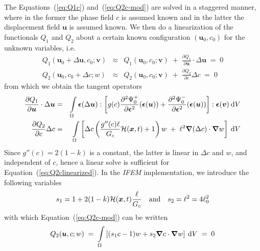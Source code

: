 \documentclass{article}
\def\deriv#1#2{\frac{\partial#1}{\partial#2}}
\def\dderiv#1#2{\frac{\partial^2#1}{\partial#2^2}}
\def\dV{\:{\rm d}V}
\begin{document}
The Equations~(\ref{eq:Q1c}) and~(\ref{eq:Q2c-mod}) are solved in a
staggered manner, where in the former the phase field $c$ is assumed known and
in the latter the displacement field $\bm{u}$ is assumed known.
We then do a linearization of the functionals $Q_1$ and $Q_2$ about a certain
known configuration $(\bm{u}_0,c_0)$ for the unknown variables, i.e.
%
\begin{eqnarray}
  \label{eq:Q1clinearized}
  Q_1(\bm{u}_0+\Delta\bm{u},c_0;\bm{v}) &\approx&
  Q_1(\bm{u}_0,c_0;\bm{v}) \;+\; \deriv{Q_1}{\bm{u}}\cdot\Delta\bm{u} \;=\; 0 \\
  \label{eq:Q2clinearized}
  Q_2(\bm{u}_0,c_0+\Delta c;w) &\approx&
  Q_2(\bm{u}_0,c_0;\bm{v}) \;+\; \deriv{Q_2}{c}\Delta c\;=\; 0
\end{eqnarray}
%
from which we obtain the tangent operators
%
\begin{eqnarray}
  \label{eq:Q1ctangent}
  \deriv{Q_1}{\bm{u}}\cdot\Delta\bm{u} &=&
  \int\limits_\Omega \bm{\epsilon}(\Delta\bm{u}) : \left[
    g(c)\dderiv{\Psi_0^+}{\bm{\epsilon}}(\bm{\epsilon}(\bm{u})) +
        \dderiv{\Psi_0^-}{\bm{\epsilon}}(\bm{\epsilon}(\bm{u}))
    \right] : \bm{\epsilon}(\bm{v})\dV \\
  \label{eq:Q2ctangent}
  \deriv{Q_2}{c}\Delta c &=&
  \int\limits_\Omega \left[ \Delta c \left(
    \frac{g''(c)\ell}{G_c}{\cal H}(\bm{x},t) + 1 \right) w \;+\;
    \ell^2\bm{\nabla}(\Delta c)\cdot\bm{\nabla}w \right] \dV
\end{eqnarray}
%
Since $g''(c)=2(1-k)$ is a constant, the latter is linear in $\Delta c$ and $w$,
and independent of $c$, hence a linear solve is sufficient for
Equation~(\ref{eq:Q2clinearized}).
In the {\sl IFEM} implementation, we introduce the following variables
%
\begin{equation}
  s_1 = 1 + 2(1-k){\cal H}(\bm{x},t)\frac{\ell}{G_c} \quad\mbox{and}\quad
  s_2 = \ell^2 = 4\ell_0^2
\end{equation}
%
with which Equation~(\ref{eq:Q2c-mod}) can be written
%
\begin{equation}
  \label{eq:Q2c-IFEM}
  Q_2(\bm{u},c;w) \;=\; \int\limits_\Omega \left[
    (s_1c-1)w + s_2\bm{\nabla}c\cdot\bm{\nabla}w \right] \dV \;=\; 0
\end{equation}
\end{document}
